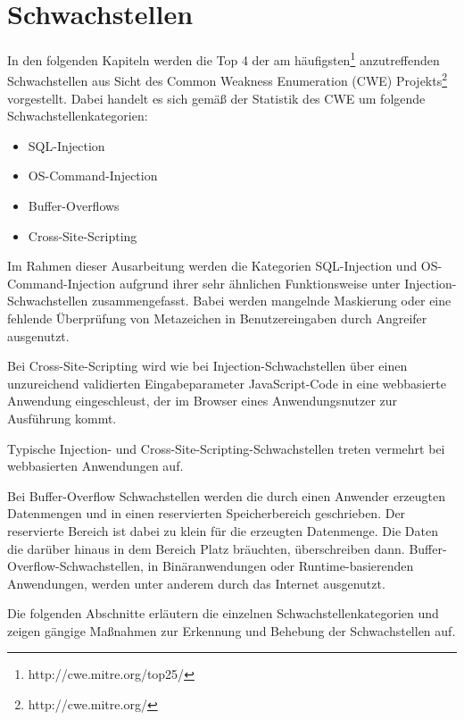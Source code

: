 \section{Schwachstellen}

In den folgenden Kapiteln werden die Top 4 der am häufigsten\footnote{http://cwe.mitre.org/top25/} 
anzutreffenden Schwachstellen aus Sicht des Common Weakness Enumeration (CWE) 
Projekts\footnote{http://cwe.mitre.org/} vorgestellt. Dabei handelt es sich 
gemäß der Statistik des CWE um folgende Schwachstellenkategorien:

\begin{itemize}
  \item SQL-Injection
  \item OS-Command-Injection
  \item Buffer-Overflows
  \item Cross-Site-Scripting
\end{itemize}

Im Rahmen dieser Ausarbeitung werden die Kategorien SQL-Injection und 
OS-Command-Injection aufgrund ihrer sehr ähnlichen Funktionsweise 
unter Injection-Schwachstellen zusammengefasst.
Babei werden mangelnde Maskierung oder eine fehlende Überprüfung von Metazeichen 
in Benutzereingaben durch Angreifer ausgenutzt.

Bei Cross-Site-Scripting wird wie bei Injection-Schwachstellen 
über einen unzureichend validierten Eingabeparameter JavaScript-Code in 
eine webbasierte Anwendung eingeschleust, der im Browser eines 
Anwendungsnutzer zur Ausführung kommt.

Typische Injection- und Cross-Site-Scripting-Schwachstellen treten 
vermehrt bei webbasierten Anwendungen auf.

Bei Buffer-Overflow Schwachstellen werden die durch einen Anwender erzeugten
Datenmengen und in einen reservierten Speicherbereich geschrieben. 
Der reservierte Bereich ist dabei zu klein für die erzeugten Datenmenge.
Die Daten die darüber hinaus in dem Bereich Platz bräuchten, überschreiben 
dann.  
Buffer-Overflow-Schwachstellen, in Binäranwendungen oder 
Runtime-basierenden Anwendungen, werden unter anderem durch das Internet 
ausgenutzt.

Die folgenden Abschnitte erläutern die einzelnen Schwachstellenkategorien 
und zeigen gängige Maßnahmen zur Erkennung und Behebung der Schwachstellen auf.




